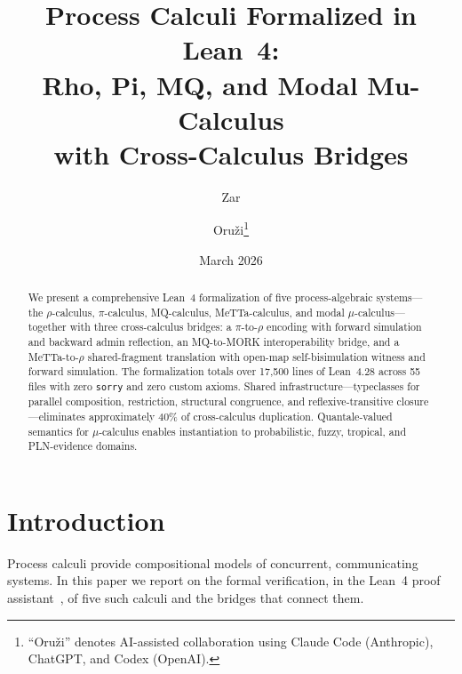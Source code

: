 \documentclass[11pt]{article}
\title{Process Calculi Formalized in Lean~4:\\
\large Rho, Pi, MQ, and Modal Mu-Calculus \\
with Cross-Calculus Bridges}
\author{Zar \and Oru\v{z}i\footnote{%
``Oru\v{z}i'' denotes AI-assisted collaboration
using Claude Code (Anthropic), ChatGPT, and Codex (OpenAI).}}
\date{March 2026}
\theoremstyle{definition}
\theoremstyle{remark}
\begin{document}
\maketitle

\begin{abstract}
We present a comprehensive Lean~4 formalization of five process-algebraic
systems---the $\rho$-calculus, $\pi$-calculus, MQ-calculus,
MeTTa-calculus, and modal $\mu$-calculus---together with three
cross-calculus bridges: a $\pi$-to-$\rho$ encoding with forward
simulation and backward admin reflection, an MQ-to-MORK
interoperability bridge, and a MeTTa-to-$\rho$ shared-fragment
translation with open-map self-bisimulation witness and forward
simulation.
The formalization totals over 17{,}500 lines of Lean~4.28 across 55
files with zero \texttt{sorry} and zero custom axioms.
Shared infrastructure---typeclasses for parallel composition,
restriction, structural congruence, and reflexive-transitive
closure---eliminates approximately 40\% of cross-calculus duplication.
Quantale-valued semantics for $\mu$-calculus enables instantiation to
probabilistic, fuzzy, tropical, and PLN-evidence domains.
\end{abstract}


\section{Introduction}
\label{sec:intro}

Process calculi provide compositional models of concurrent, communicating
systems.  In this paper we report on the formal verification, in the
Lean~4 proof assistant~\cite{Moura2021}, of five such calculi and the
bridges that connect them.
\end{document}
